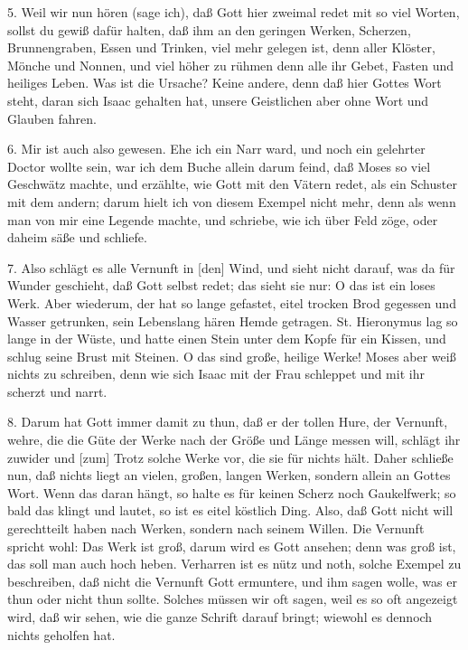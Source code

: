 5. Weil wir nun hören (sage ich), daß Gott hier zweimal redet mit so viel Worten, sollst du gewiß dafür halten, daß ihm an den geringen Werken, Scherzen, Brunnengraben, Essen und Trinken, viel mehr gelegen ist, denn aller Klöster, Mönche und Nonnen, und viel höher zu rühmen denn alle ihr Gebet, Fasten und heiliges Leben. Was ist die Ursache? Keine andere, denn daß hier Gottes Wort steht, daran sich Isaac gehalten hat, unsere Geistlichen aber ohne Wort und Glauben fahren.

6. Mir ist auch also gewesen. Ehe ich ein Narr ward, und noch ein gelehrter Doctor wollte sein, war ich dem Buche allein darum feind, daß Moses so viel Geschwätz machte, und erzählte, wie Gott mit den Vätern redet, als ein Schuster mit dem andern; darum hielt ich von diesem Exempel nicht mehr, denn als wenn man von mir eine Legende machte, und schriebe, wie ich über Feld zöge, oder daheim säße und schliefe.

7. Also schlägt es alle Vernunft in [den] Wind, und sieht nicht darauf, was da für Wunder geschieht, daß Gott selbst redet; das sieht sie nur: O das ist ein loses Werk. Aber wiederum, der hat so lange gefastet, eitel trocken Brod gegessen und Wasser getrunken, sein Lebenslang hären Hemde getragen. St. Hieronymus lag so lange in der Wüste, und hatte einen Stein unter dem Kopfe für ein Kissen, und schlug seine Brust mit Steinen. O das sind große, heilige Werke! Moses aber weiß nichts zu schreiben, denn wie sich Isaac mit der Frau schleppet und mit ihr scherzt und narrt.

8. Darum hat Gott immer damit zu thun, daß er der tollen Hure, der Vernunft, wehre, die die Güte der Werke nach der Größe und Länge messen will, schlägt ihr zuwider und [zum] Trotz solche Werke vor, die sie für nichts hält. Daher schließe nun, daß nichts liegt an vielen, großen, langen Werken, sondern allein an Gottes Wort. Wenn das daran hängt, so halte es für keinen Scherz noch Gaukelfwerk; so bald das klingt und lautet, so ist es eitel köstlich Ding. Also, daß Gott nicht will gerechtteilt haben nach Werken, sondern nach seinem Willen. Die Vernunft spricht wohl: Das Werk ist groß, darum wird es Gott ansehen; denn was groß ist, das soll man auch hoch heben. Verharren ist es nütz und noth, solche Exempel zu beschreiben, daß nicht die Vernunft Gott ermuntere, und ihm sagen wolle, was er thun oder nicht thun sollte. Solches müssen wir oft sagen, weil es so oft angezeigt wird, daß wir sehen, wie die ganze Schrift darauf bringt; wiewohl es dennoch nichts geholfen hat.

